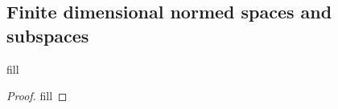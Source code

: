 \subsection{Finite dimensional normed spaces and subspaces}

\begin{exercise}{1}
fill
\end{exercise}
\begin{proof}
fill
\end{proof}